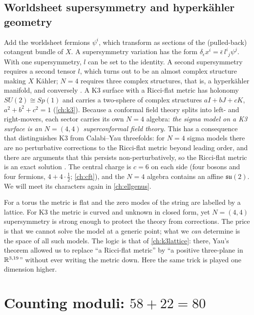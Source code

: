 \subsection{Worldsheet supersymmetry and hyperk\"ahler geometry}
Add the worldsheet fermions $\psi^i$, which transform as sections of the (pulled-back)
cotangent bundle of $X$. A supersymmetry variation has the form
$\delta_\epsilon x^i=\bar\epsilon\,l^i{}_j\psi^j$. With one supersymmetry, $l$ can be set to
the identity. A second supersymmetry requires a second tensor $l$, which turns out to be an
almost complex structure making $X$ K\"ahler; $N=4$ requires three complex structures, that is,
a hyperk\"ahler manifold, and conversely . A K3 surface with
a Ricci-flat metric has holonomy $SU(2)\cong Sp(1)$ and carries a two-sphere of complex
structures $aI+bJ+cK$, $a^2+b^2+c^2=1$ (\cref{ch:k3}). Because a conformal field theory splits
into left- and right-movers, each sector carries its own $N=4$ algebra: \emph{the sigma model
on a K3 surface is an $N=(4,4)$ superconformal field theory.}
This has a consequence that distinguishes K3 from Calabi--Yau threefolds: for $N=4$ sigma
models there are no perturbative corrections to the Ricci-flat metric beyond leading order,
and there are arguments that this persists non-perturbatively, so the Ricci-flat metric is an
exact solution  \TL. The central charge is $c=6$ on each side
(four bosons and four fermions, $4+4\cdot\tfrac12$; \cref{ch:cft}), and the $N=4$ algebra
contains an affine $\mathfrak{su}(2)$. We will meet its characters again in
\cref{ch:ellgenus}.

\begin{physicsbox}
For a torus the metric is flat and the zero modes of the string are labelled by a lattice.
For K3 the metric is curved and unknown in closed form,
yet $N=(4,4)$ supersymmetry is strong enough to protect the theory from corrections. The
price is that we cannot solve the model at a generic point; what we \emph{can} determine is
the space of all such models. The logic is that of \cref{ch:k3lattice}: there, Yau's theorem
allowed us to replace ``a Ricci-flat metric'' by ``a positive three-plane in $\mathbb{R}^{3,19}$''
without ever writing the metric down. Here the same trick is played one dimension higher.
\end{physicsbox}

\section{Counting moduli: \texorpdfstring{$58+22=80$}{58+22=80}}\label{sec:stringsk3:count}

